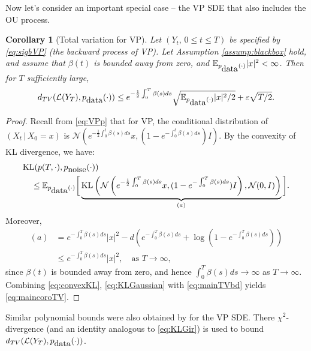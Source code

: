 \documentclass[letterpaper,11pt,reqno]{amsart}
\newtheorem{corollary}[theorem]{Corollary}
\numberwithin{equation}{section}
\begin{document}
\quad Now let's consider an important special case -- the VP SDE
that also includes the OU process.
\begin{corollary}[Total variation for VP]
\label{coro:VPSDE}
Let $(Y_t, \, 0 \le t \le T)$ be specified by \eqref{eq:sigbVP} (the backward process of VP).
Let Assumption \ref{assump:blackbox} hold, 
and assume that $\beta(t)$ is bounded away from zero,
and $\mathbb{E}_{p_{\tiny \mbox{data}}(\cdot)} |x|^2 < \infty$.
Then for $T$ sufficiently large,
\begin{equation}
\label{eq:maincoroTV}
d_{TV}(\mathcal{L}(Y_T), p_{\tiny \mbox{data}}(\cdot)) \le 
e^{-\frac{1}{2}\int_0^T \beta(s) ds} \sqrt{\mathbb{E}_{p_{\tiny \mbox{data}}(\cdot)} |x|^2/2} + \varepsilon \sqrt{T/2}.
\end{equation}
\end{corollary}
\begin{proof}
Recall from \eqref{eq:VPp} that 
for VP,
the conditional distribution of $(X_t \,|\, X_0 = x)$ is
$\mathcal{N} \left( e^{-\frac{1}{2} \int_0^t \beta(s) ds} x, (1 - e^{-\int_0^t \beta(s) ds}) I  \right)$.
By the convexity of KL divergence,
we have:
\begin{equation}
\label{eq:convexKL}
\begin{aligned}
& \mbox{KL}(p(T, \cdot), p_{\tiny \mbox{noise}}(\cdot)) \\
& \quad \le \mathbb{E}_{p_{\tiny \mbox{data}}(\cdot)}
\bigg[\underbrace{\mbox{KL}\left( \mathcal{N} \left( e^{-\frac{1}{2} \int_0^T \beta(s) ds} x, (1 - e^{-\int_0^T \beta(s) ds}) I  \right), \mathcal{N}(0, I)\right)}_{(a)}\bigg].
\end{aligned}
\end{equation}
Moreover,
\begin{equation}
\label{eq:KLGaussian}
\begin{aligned}
(a) &= e^{- \int_0^T \beta(s) ds} |x|^2 - d \left( e^{-\int_0^T \beta(s) ds} + \log (1 - e^{-\int_0^T \beta(s) ds}) \right) \\
& \le e^{- \int_0^T \beta(s) ds} |x|^2, \quad \mbox{as } T \to \infty,
\end{aligned}
\end{equation}
since $\beta(t)$ is bounded away from zero, 
and hence $\int_0^T \beta(s) ds \to \infty$ as $T \to \infty$.
Combining \eqref{eq:convexKL}, \eqref{eq:KLGaussian} with \eqref{eq:mainTVbd} yields \eqref{eq:maincoroTV}.
\end{proof}

\quad Similar polynomial bounds were also obtained by \cite{LLT22, LLT23}
for the VP SDE.
There $\chi^2$-divergence (and an identity analogous to \eqref{eq:KLGir})
is used to 
bound $d_{TV}(\mathcal{L}(Y_T), p_{\tiny \mbox{data}}(\cdot))$. 
\end{document}
